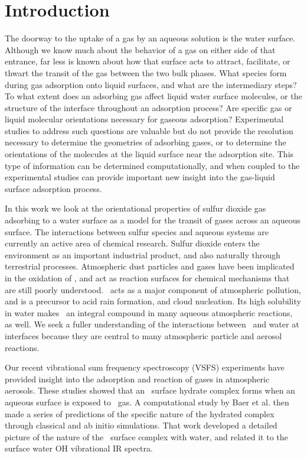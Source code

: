 \section{Introduction}

The doorway to the uptake of a gas by an aqueous solution is the water surface. Although we know much about the behavior of a gas on either side of that entrance, far less is known about how that surface acts to attract, facilitate, or thwart the transit of the gas between the two bulk phases. What species form during gas adsorption onto liquid surfaces, and what are the intermediary steps?  To what extent does an adsorbing gas affect liquid water surface molecules, or the structure of the interface throughout an adsorption process?  Are specific gas or liquid molecular orientations necessary for gaseous adsorption?  Experimental studies to address such questions are valuable but do not provide the resolution necessary to determine the geometries of adsorbing gases, or to determine the orientations of the molecules at the liquid surface near the adsorption site.
This type of information can be determined computationally, and when coupled to the experimental studies can provide important new insight into the gas-liquid surface adsorption process.

In this work we look at the orientational properties of sulfur dioxide gas adsorbing to a water surface as a model for the transit of gases across an aqueous surface.  The interactions between sulfur species and aqueous systems are currently an active area of chemical research. Sulfur dioxide enters the environment as an important industrial product, and also naturally through terrestrial processes. Atmospheric dust particles and gases have been implicated in the oxidation of \suldiox, and act as reaction surfaces for chemical mechanisms that are still poorly understood.\cite{Baltrusaitis2011,Rubasinghege2010,Li2007} \suldiox~acts as a major component of atmospheric pollution, and is a precursor to acid rain formation, and cloud nucleation. Its high solubility in water makes \suldiox~an integral compound in many aqueous atmospheric reactions, as well. We seek a fuller understanding of the interactions between \suldiox~and water at interfaces because they are central to many atmospheric particle and aerosol reactions.

Our recent vibrational sum frequency spectroscopy (VSFS) experiments have provided insight into the adsorption and reaction of gases in atmospheric aerosols.\cite{Tarbuck2005,Tarbuck2006} These studies showed that an \suldiox~surface hydrate complex forms when an aqueous surface is exposed to \suldiox~gas. A computational study by Baer et al.\cite{Baer2010} then made a series of predictions of the specific nature of the hydrated complex through classical and ab initio simulations. That work developed a detailed picture of the nature of the \suldiox~surface complex with water, and related it to the surface water OH vibrational IR spectra.

